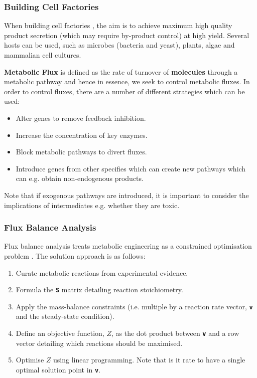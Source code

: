 \documentclass[a4paper]{article}
\newcommand{\ix}[1]{%
  \leavevmode %
  \marginpar{\small\emph{#1}}%
}
\begin{document}
\subsubsection*{Building Cell Factories}
When building cell factories\ix{Goal}, the aim is to achieve maximum high quality product secretion (which may require by-product control) at high yield. Several hosts can be used, such as microbes (bacteria and yeast), plants, algae and mammalian cell cultures.

\textbf{Metabolic Flux}\ix{Flux} is defined as the rate of turnover of \textbf{molecules} through a metabolic pathway and hence in essence, we seek to control metabolic fluxes. In order to control fluxes, there are a number of different strategies which can be used:\ix{Strategies}
\begin{itemize}
	\item Alter genes to remove feedback inhibition.
	\item Increase the concentration of key enzymes.
	\item Block metabolic pathways to divert fluxes. 
	\item Introduce genes from other specifies which can create new pathways which can e.g. obtain non-endogenous products. 
\end{itemize}
Note that if exogenous pathways are introduced, it is important to consider the implications of intermediates e.g. whether they are toxic. 
\subsubsection*{Flux Balance Analysis}
Flux balance analysis treats metabolic engineering as a constrained optimisation problem\ix{FBA}. The solution approach is as follows:
\begin{enumerate}
\item Curate metabolic reactions from experimental evidence.
\item Formula the \texttt{\textbf{S}} matrix detailing reaction stoichiometry.
\item Apply the mass-balance constraints (i.e. multiple by a reaction rate vector, \texttt{\textbf{v}} and the steady-state condition).
\item Define an objective function, $Z$, as the dot product between \texttt{\textbf{v}} and a row vector detailing which reactions should be maximised.
\item Optimise $Z$ using linear programming. Note that is it rate to have a single optimal solution point in \texttt{\textbf{v}}.
\end{enumerate}
\end{document}
